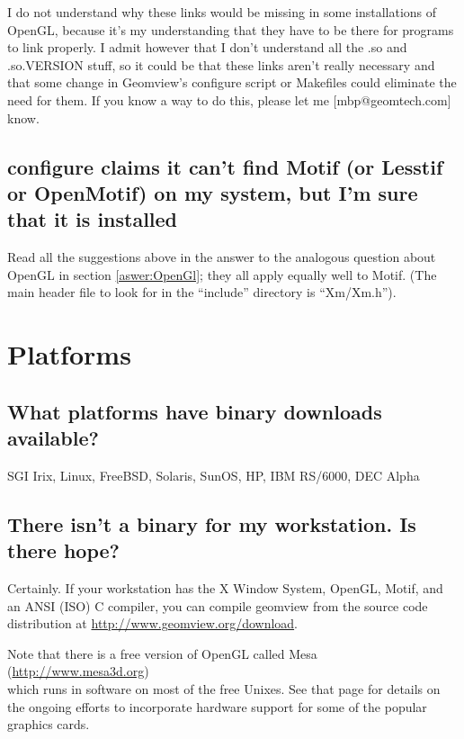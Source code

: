 \documentclass[12pt,a4paper]{article}
\begin{document}
\begin{itemize}
            I do not understand why these links would be missing in some
            installations of OpenGL, because it's my understanding that they
            have to be there for programs to link properly. I admit however that
            I don't understand all the .so and .so.VERSION stuff, so it could be
            that these links aren't really necessary and that some change in
            Geomview's configure script or Makefiles could eliminate the need
            for them. If you know a way to do this, please let me
            [mbp@geomtech.com] know.
     \end{itemize}

    \subsection{configure claims it can't find Motif (or Lesstif or OpenMotif) on my system, but I'm sure that it is installed }

        Read all the suggestions above in the answer to the analogous question
        about OpenGL in section \ref{aswer:OpenGl}; they all apply equally well to
        Motif. (The main header file to look for in the ``include'' directory is
        ``Xm/Xm.h'').

\section{Platforms}

    \subsection{What platforms have binary downloads available?}

        SGI Irix, Linux, FreeBSD, Solaris, SunOS, HP, IBM RS/6000, DEC Alpha

    \subsection{There isn't a binary for my workstation. Is there hope?}

        Certainly. If your workstation has the X Window System, OpenGL, Motif,
        and an ANSI (ISO) C compiler, you can compile geomview from the source
        code distribution at \url{http://www.geomview.org/download}.

        Note that there is a free version of OpenGL called Mesa\\
        (\url{http://www.mesa3d.org})\\
        which runs in software on most of the free
        Unixes. See that page for details on the ongoing efforts to incorporate
        hardware support for some of the popular graphics cards.
\end{document}
